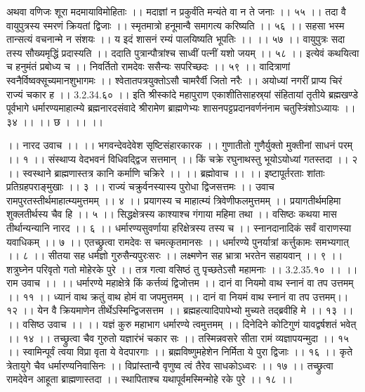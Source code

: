 अथवा वणिजः शूरा मदमायाविमोहिताः ।।
मदाज्ञां न प्रकुर्वंति मन्यंते वा न ते जनाः ।। ५५ ।।
तदा वै वायुपुत्रस्य स्मरणं क्रियतां द्विजाः ।।
स्मृतमात्रो हनूमान्वै समागत्य करिष्यति ।। ५६ ।।
सहसा भस्म तान्सत्यं वचनान्मे न संशयः ।।
य इदं शासनं रम्यं पालयिष्यति भूपतिः ।। ।। ५७ ।।
वायुपुत्रः सदा तस्य सौख्यमृद्धिं प्रदास्यति ।।
ददाति पुत्रान्पौत्रांश्च साध्वीं पत्नीं यशो जयम् ।। ५८ ।।
इत्येवं कथयित्वा च हनुमंतं प्रबोध्य च ।।
निवर्तितो रामदेवः ससैन्यः सपरिच्छदः ।। ५९ ।।
वादित्राणां स्वनैर्विष्वक्सूच्यमानशुभागमः ।।
श्वेतातपत्रयुक्तोऽसौ चामरैर्वी जितो नरैः ।।
अयोध्यां नगरीं प्राप्य चिरं राज्यं चकार ह ।। 3.2.34.६० ।।
इति श्रीस्कांदे महापुराण एकाशीतिसाहस्र्यां संहितायां तृतीये ब्रह्मखण्डे पूर्वभागे धर्मारण्यमाहात्म्ये ब्रह्मनारदसंवादे श्रीरामेण ब्राह्मणेभ्यः शासनपट्टप्रदानवर्णनंनाम चतुस्त्रिंशोऽध्यायः ।। ३४ ।। ।। छ । ।। ।।

।। नारद उवाच ।। ।।
भगवन्देवदेवेश सृष्टिसंहारकारक ।।
गुणातीतो गुणैर्युक्तो मुक्तीनां साधनं परम् ।। १ ।।
संस्थाप्य वेदभवनं विधिवद्द्विज सत्तमान् ।।
किं चक्रे रघुनाथस्तु भूयोऽयोध्यां गतस्तदा ।। २ ।।
स्वस्थाने ब्राह्मणास्तत्र कानि कर्माणि चक्रिरे ।।
।। ब्रह्मोवाच ।। ।।
इष्टापूर्तरताः शांताः प्रतिग्रहपराङ्मुखाः ।। ३ ।।
राज्यं चक्रुर्वनस्यास्य पुरोधा द्विजसत्तमः ।।
उवाच रामपुरतस्तीर्थमाहात्म्यमुत्तमम् ।। ४ ।।
प्रयागस्य च माहात्म्यं त्रिवेणीफलमुत्तमम् ।।
प्रयागतीर्थमहिमा शुक्लतीर्थस्य चैव हि ।। ५ ।।
सिद्धक्षेत्रस्य काश्याश्च गंगाया महिमा तथा ।।
वसिष्ठः कथया मास तीर्थान्यन्यानि नारद ।। ६ ।।
धर्मारण्यसुवर्णाया हरिक्षेत्रस्य तस्य च ।।
स्नानदानादिकं सर्वं वाराणस्या यवाधिकम् ।। ७ ।।
एतच्छ्रुत्वा रामदेवः स चमत्कृतमानसः ।।
धर्मारण्ये पुनर्यात्रां कर्त्तुकामः समभ्यगात् ।। ८ ।।
सीतया सह धर्मज्ञो गुरुसैन्यपुरःसरः ।।
लक्ष्मणेन सह भ्रात्रा भरतेन सहायवान् ।। ९ ।।
शत्रुघ्नेन परिवृतो गतो मोहेरके पुरे ।।
तत्र गत्वा वसिष्ठं तु पृच्छतेऽसौ महामनाः ।। 3.2.35.१० ।।
।। राम उवाच ।। ।।
धर्मारण्ये महाक्षेत्रे किं कर्त्तव्यं द्विजोत्तम ।।
दानं वा नियमो वाथ स्नानं वा तप उत्तमम् ।। ११ ।।
 ध्यानं वाथ क्रतुं वाथ होमं वा जपमुत्तमम् ।।
दानं वा नियमं वाथ स्नानं वा तप उत्तमम्।। १२ ।।
येन वै क्रियमाणेन तीर्थेऽस्मिन्द्विजसत्तम ।।
ब्रह्महत्यादिपापेभ्यो मुच्यते तद्ब्रवीहि मे ।। १३ ।।
।। वसिष्ठ उवाच ।। ।।
यज्ञं कुरु महाभाग धर्मारण्ये त्वमुत्तमम् ।।
दिनेदिने कोटिगुणं यावद्वर्षशतं भवेत् ।। १४ ।।
तच्छ्रुत्वा चैव गुरुतो यज्ञारंभं चकार सः ।।
तस्मिन्नवसरे सीता रामं व्यज्ञापयन्मुदा ।। १५ ।।
स्वामिन्पूर्वं त्वया विप्रा वृता ये वेदपारगाः ।।
ब्रह्मविष्णुमहेशेन निर्मिता ये पुरा द्विजाः ।। १६ ।।
कृते त्रेतायुगे चैव धर्मारण्यनिवासिनः ।।
विप्रांस्तान्वै वृणुष्व त्वं तैरेव साधकोऽध्वरः ।। १७ ।।
तच्छ्रुत्वा रामदेवेन आहूता ब्राह्मणास्तदा ।।
स्थापिताश्च यथापूर्वमस्मिन्मोहे रके पुरे ।। १८ ।।
